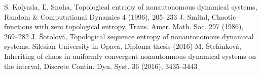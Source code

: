 \documentclass{amsart}
\begin{document}
\begin{thebibliography}{19}
	S. Kolyada, \v{L}. Snoha,
	Topological entropy of nonautonomous dynamical systems,
	Random \& Computational Dynamics 4 (1996),
	205--233
	J. Sm\'{i}tal,
	Chaotic functions with zero topological entropy,
	Trans. Amer. Math. Soc. 297 (1986),
	269--282
	J. \v{S}otolov\'{a},
	Topological sequence entropy of nonautonomous dynamical systems,
	Silesian University in Opava,
	Diploma thesis (2016)
	M. \v{S}tef\'{a}nkov\'{a},
	Inheriting of chaos in uniformly convergent nonautonmous dynamical systems on the interval,
	Discrete Contin. Dyn. Syst. 36 (2016),
	3435--3443
\end{thebibliography}
\end{document}
